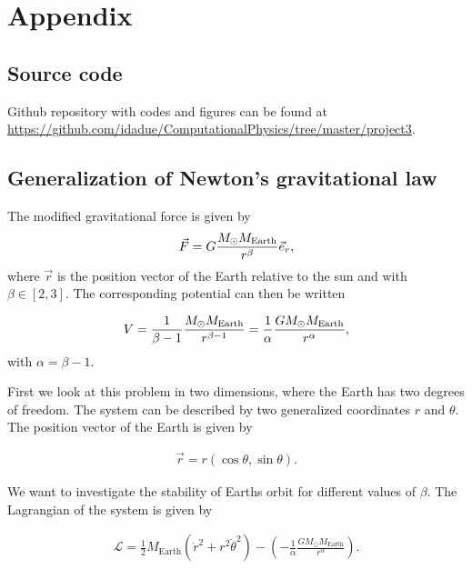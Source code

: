 \documentclass[../main.tex]{subfiles}
\begin{document}
\appendix
\renewcommand{\theequation}{A\arabic{equation}}
\setcounter{equation}{0}
\section{Appendix}
\subsection{Source code}
Github repository with codes and figures can be found at \url{https://github.com/idadue/ComputationalPhysics/tree/master/project3}.

\subsection{Generalization of Newton's gravitational law}\label{sec:appendix_generalized_grav_law}
The modified gravitational force is given by 
\begin{align}
    \vec{F}=G\frac{M_{\odot} M_{\textnormal{\text{Earth}}}}{r^{\beta}}\vec{e}_r,
\end{align} where \ensuremath{\vec{r}} is the position vector of the Earth relative to the sun and with \ensuremath{\beta \in [2,3]}. The corresponding potential can then be written

\begin{align}
    V = \frac{1}{\beta-1}\frac{M_{\odot} M_{\textnormal{\text{Earth}}}}{r^{\beta-1}}=\frac{1}{\alpha}\frac{GM_{\odot} M_{\text{Earth}}}{r^{\alpha}}, 
\end{align} with \ensuremath{\alpha = \beta - 1}. 

First we look at this problem in two dimensions, where the Earth has two degrees of freedom. The system can be described by two generalized coordinates \ensuremath{r} and \ensuremath{\theta}. The position vector of the Earth is given by

\begin{align*}
    \vec{r}=r(\cos\theta,\sin\theta).
\end{align*}

We want to investigate the stability of Earths orbit for different values of \ensuremath{\beta}. The Lagrangian of the system is given by

\begin{align*}
    \mathcal{L}=\frac{1}{2}M_{\text{Earth}}(\dot{r}^2+r^2\dot{\theta}^2)-\left(-\frac{1}{\alpha}\frac{GM_{\odot} M_{\text{Earth}}}{r^{\alpha}}\right).
\end{align*}
\end{document}
